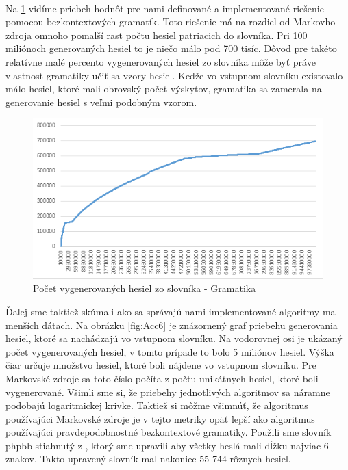 \paragraph{}
Na \ref{fig:AccCFG} vidíme priebeh hodnôt pre nami definované a implementované riešenie pomocou bezkontextových gramatík. Toto riešenie má na rozdiel od Markovho zdroja omnoho pomalší rast počtu hesiel patriacich do slovníka. Pri 100 miliónoch generovaných hesiel to je niečo málo pod 700 tisíc. Dôvod pre takéto relatívne malé percento vygenerovaných hesiel zo slovníka môže byť práve vlastnosť gramatiky učiť sa vzory hesiel. Keďže vo vstupnom slovníku existovalo málo hesiel, ktoré mali obrovský počet výskytov, gramatika sa zamerala na generovanie hesiel s veľmi podobným vzorom.

\begin{figure}[h]
    \centering
    \includegraphics[width=1\textwidth]{Accuracy_CFG}
    \caption{Počet vygenerovaných hesiel zo slovníka - Gramatika}
    \label{fig:AccCFG}
\end{figure}

Ďalej sme taktiež skúmali ako sa správajú nami implementované algoritmy ma menších dátach. Na obrázku \ref{fig:Acc6} je znázornený graf priebehu generovania hesiel, ktoré sa nachádzajú vo vstupnom slovníku. Na vodorovnej osi je ukázaný počet vygenerovaných hesiel, v tomto prípade to bolo 5 miliónov hesiel. Výška čiar určuje množstvo hesiel, ktoré boli nájdene vo vstupnom slovníku. Pre Markovské zdroje sa toto číslo počíta z počtu unikátnych hesiel, ktoré boli vygenerované. Všimli sme si, že priebehy jednotlivých algoritmov sa náramne podobajú logaritmickej krivke. Taktiež si môžme všimnúť, že algoritmus používajúci Markovské zdroje je v tejto metriky opäť lepší ako algoritmus používajúci pravdepodobnostné bezkontextové gramatiky. Použili sme slovník phpbb stiahnutý z \cite{dictionaries}, ktorý sme upravili aby všetky heslá mali dĺžku najviac 6 znakov. Takto upravený slovník mal nakoniec 55 744 rôznych hesiel.

